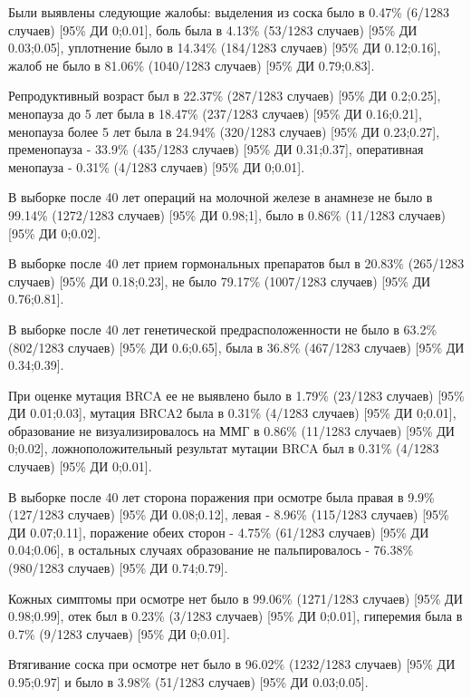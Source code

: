 \documentclass[
]{article}
\begin{document}
Были выявлены следующие жалобы: выделения из соска было в 0.47\% (6/1283
случаев) {[}95\% ДИ 0;0.01{]}, боль была в 4.13\% (53/1283 случаев)
{[}95\% ДИ 0.03;0.05{]}, уплотнение было в 14.34\% (184/1283 случаев)
{[}95\% ДИ 0.12;0.16{]}, жалоб не было в 81.06\% (1040/1283 случаев)
{[}95\% ДИ 0.79;0.83{]}.

Репродуктивный возраст был в 22.37\% (287/1283 случаев) {[}95\% ДИ
0.2;0.25{]}, менопауза до 5 лет была в 18.47\% (237/1283 случаев)
{[}95\% ДИ 0.16;0.21{]}, менопауза более 5 лет была в 24.94\% (320/1283
случаев) {[}95\% ДИ 0.23;0.27{]}, пременопауза - 33.9\% (435/1283
случаев) {[}95\% ДИ 0.31;0.37{]}, оперативная менопауза - 0.31\% (4/1283
случаев) {[}95\% ДИ 0;0.01{]}.

В выборке после 40 лет операций на молочной железе в анамнезе не было в
99.14\% (1272/1283 случаев) {[}95\% ДИ 0.98;1{]}, было в 0.86\% (11/1283
случаев) {[}95\% ДИ 0;0.02{]}.

В выборке после 40 лет прием гормональных препаратов был в 20.83\%
(265/1283 случаев) {[}95\% ДИ 0.18;0.23{]}, не было 79.17\% (1007/1283
случаев) {[}95\% ДИ 0.76;0.81{]}.

В выборке после 40 лет генетической предрасположенности не было в 63.2\%
(802/1283 случаев) {[}95\% ДИ 0.6;0.65{]}, была в 36.8\% (467/1283
случаев) {[}95\% ДИ 0.34;0.39{]}.

При оценке мутация BRCA ее не выявлено было в 1.79\% (23/1283 случаев)
{[}95\% ДИ 0.01;0.03{]}, мутация BRCA2 была в 0.31\% (4/1283 случаев)
{[}95\% ДИ 0;0.01{]}, образование не визуализировалось на ММГ в 0.86\%
(11/1283 случаев) {[}95\% ДИ 0;0.02{]}, ложноположительный результат
мутации BRCA был в 0.31\% (4/1283 случаев) {[}95\% ДИ 0;0.01{]}.

В выборке после 40 лет сторона поражения при осмотре была правая в 9.9\%
(127/1283 случаев) {[}95\% ДИ 0.08;0.12{]}, левая - 8.96\% (115/1283
случаев) {[}95\% ДИ 0.07;0.11{]}, поражение обеих сторон - 4.75\%
(61/1283 случаев) {[}95\% ДИ 0.04;0.06{]}, в остальных случаях
образование не пальпировалось - 76.38\% (980/1283 случаев) {[}95\% ДИ
0.74;0.79{]}.

Кожных симптомы при осмотре нет было в 99.06\% (1271/1283 случаев)
{[}95\% ДИ 0.98;0.99{]}, отек был в 0.23\% (3/1283 случаев) {[}95\% ДИ
0;0.01{]}, гиперемия была в 0.7\% (9/1283 случаев) {[}95\% ДИ 0;0.01{]}.

Втягивание соска при осмотре нет было в 96.02\% (1232/1283 случаев)
{[}95\% ДИ 0.95;0.97{]} и было в 3.98\% (51/1283 случаев) {[}95\% ДИ
0.03;0.05{]}.
\end{document}
